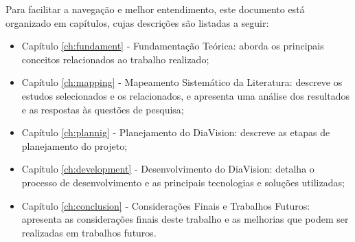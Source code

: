Para facilitar a navegação e melhor entendimento, este documento está organizado em capítulos, cujas descrições são listadas a seguir:
\begin{itemize}
    \item Capítulo \ref{ch:fundament} - Fundamentação Teórica: aborda os principais conceitos relacionados ao trabalho realizado;
    \item Capítulo \ref{ch:mapping} - Mapeamento Sistemático da Literatura: descreve os estudos selecionados e os relacionados,
     e apresenta uma análise dos resultados e as respostas às questões de pesquisa;
    \item Capítulo \ref{ch:plannig} - Planejamento do DiaVision: descreve as etapas de planejamento do projeto;
    \item Capítulo \ref{ch:development} - Desenvolvimento do DiaVision: detalha o processo de desenvolvimento e as principais tecnologias e soluções utilizadas;
    \item Capítulo \ref{ch:conclusion} - Considerações Finais e Trabalhos Futuros: apresenta as considerações finais deste trabalho e as melhorias que podem ser realizadas em trabalhos futuros.
\end{itemize}
